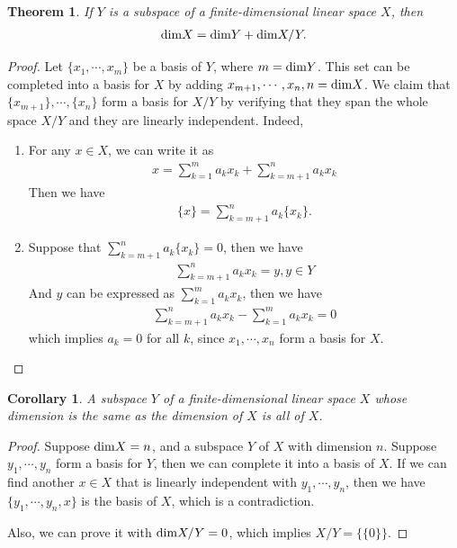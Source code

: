 \documentclass[11pt]{book}
\newtheorem{theorem}{Theorem}[section]
\newtheorem{corollary}{Corollary}[theorem]
\theoremstyle{definition}
\numberwithin{equation}{chapter}
\begin{document}
\medskip

\begin{theorem}\label{theorem_quotient_dim}
If $Y$ is a subspace of a finite-dimensional linear space $X$, then
\begin{align*}
    {\rm dim}X = {\rm dim}Y + {\rm dim}X/Y.
\end{align*}
\end{theorem}
\begin{proof}
Let $\{x_1, \cdots, x_m\}$ be a basis of $Y$, where $m = {\rm dim}Y$. This set can be completed into a basis for $X$ by adding $x_{m+1}, \cdots, x_n, n = {\rm dim}X$. We claim that $\{x_{m+1}\}, \cdots, \{x_n\}$ form a basis for $X/Y$ by  verifying that they span the whole space $X/Y$ and they are linearly independent. Indeed,
\begin{enumerate}[label=(\alph*)]
    \item For any $x\in X$, we can write it as 
    \begin{align*}
        x = \sum^m_{k=1}a_k x_k + \sum^{n}_{k=m+1}a_k x_k
    \end{align*}
    Then we have 
    \begin{align*}
        \{x\} = \sum^{n}_{k=m+1}a_k \{x_k\}.
    \end{align*}
    \item Suppose that $\sum^{n}_{k=m+1}a_k \{x_k\} = 0$, then we have 
    \begin{align*}
        \sum^{n}_{k=m+1}a_k x_k = y, y\in Y
    \end{align*}
    And $y$ can be expressed as $\sum^{m}_{k=1}a_k x_k$, then we have 
    \begin{align*}
        \sum^{n}_{k=m+1}a_k x_k - \sum^{m}_{k=1}a_k x_k = 0
    \end{align*}
    which implies $a_k = 0$ for all $k$, since $x_1, \cdots, x_n$ form a basis for $X$.
\end{enumerate}
\end{proof}


\begin{corollary}
A subspace $Y$ of a finite-dimensional linear space $X$ whose dimension is the same as the dimension of $X$ is all of $X$.
\end{corollary}
\begin{proof}
Suppose ${\rm dim}X = n$, and a subspace $Y$ of $X$ with dimension $n$. Suppose $y_1,\cdots,y_n$ form a basis for $Y$, then we can complete it into a basis of $X$. If we can find another $x\in X$ that is linearly independent with $y_1,\cdots,y_n$, then we have $\{y_1,\cdots,y_n, x\}$ is the basis of $X$, which is a contradiction. 

Also, we can prove it with ${\rm dim}X/Y = 0$, which implies $X/Y = \{\{0\}\}$.
\end{proof}
\end{document}
